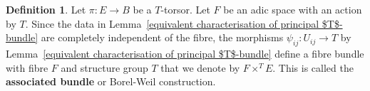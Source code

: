 \documentclass[10pt,oneside]{amsart}
\theoremstyle{definition}
\newtheorem{definition}[theorem]{Definition}
\begin{document}
	\begin{definition} \label{definition of Borel construction}
		Let $\pi\colon E\rightarrow B$ be a $T$-torsor. Let $F$ be an adic space with an action by $T$. Since the data in Lemma~\ref{equivalent characterisation of principal $T$-bundle} are completely independent of the fibre, the morphisms $\psi_{ij}\colon U_{ij}\rightarrow T$ by Lemma~\ref{equivalent characterisation of principal $T$-bundle} define a fibre bundle with fibre $F$ and structure group $T$ that we denote by $F\times^T E$. This is called the \textbf{associated bundle} or Borel-Weil construction.
	\end{definition}
	
 



 

	
	
	
\end{document}
